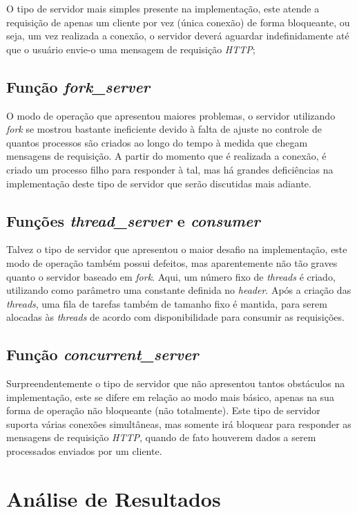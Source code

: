 \documentclass[a4paper, 12pt]{article}
\begin{document}
O tipo de servidor mais simples presente na implementação, este atende a requisição de apenas um cliente por vez (única conexão) de forma bloqueante, ou seja, um vez realizada a conexão, o servidor deverá aguardar indefinidamente até que o usuário envie-o uma mensagem de requisição \emph{HTTP};

\subsection{Função \emph{fork\_server}}

O modo de operação que apresentou maiores problemas, o servidor utilizando \emph{fork} se mostrou bastante ineficiente devido à falta de ajuste no controle de quantos processos são criados ao longo do tempo à medida que chegam mensagens de requisição. A partir do momento que é realizada a conexão, é criado um processo filho para responder à tal, mas há grandes deficiências na implementação deste tipo de servidor que serão discutidas mais adiante.

\subsection{Funções \emph{thread\_server} e \emph{consumer}}

Talvez o tipo de servidor que apresentou o maior desafio na implementação, este modo de operação também possui defeitos, mas aparentemente não tão graves quanto o servidor baseado em \emph{fork}. Aqui, um número fixo de \emph{threads} é criado, utilizando como parâmetro uma constante definida no \emph{header}. Após a criação das \emph{threads}, uma fila de tarefas também de tamanho fixo é mantida, para serem alocadas às \emph{threads} de acordo com disponibilidade para consumir as requisições.

\subsection{Função \emph{concurrent\_server}}

Surpreendentemente o tipo de servidor que não apresentou tantos obstáculos na implementação, este se difere em relação ao modo mais básico, apenas na sua forma de operação não bloqueante (não totalmente). Este tipo de servidor suporta várias conexões simultâneas, mas somente irá bloquear para responder as mensagens de requisição \emph{HTTP}, quando de fato houverem dados a serem processados enviados por um cliente.

\section{Análise de Resultados}
\end{document}
